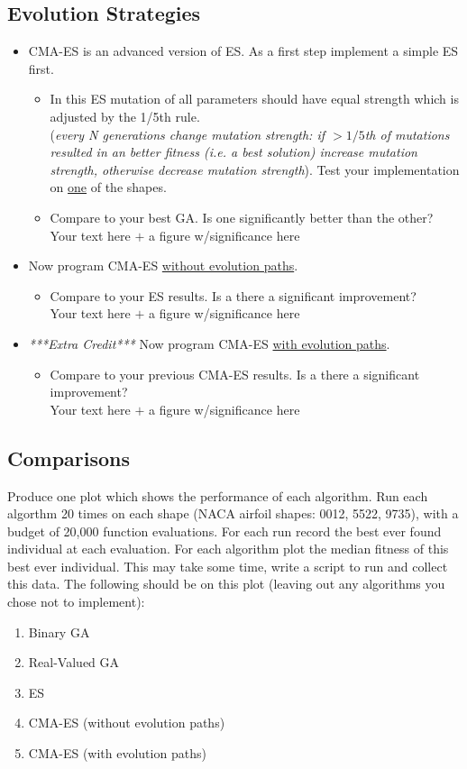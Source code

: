 \documentclass{article}
\begin{document}
\subsection{Evolution Strategies}
\begin{itemize}
	\item CMA-ES is an advanced version of ES. As a first step implement a simple ES first. 
		\begin{itemize}
			\item In this ES mutation of all parameters should have equal strength which is adjusted by the 1/5th rule.\\(\textit{every N generations change mutation strength: if $>1/5$th of mutations resulted in an better fitness (i.e. a best solution) increase mutation strength, otherwise decrease mutation strength}). Test your implementation on \underline{one} of the shapes.
			\item Compare to your best GA. Is one significantly better than the other?
			\\\color{red}Your text here $+$ a figure w/significance here\color{black}
		\end{itemize}
	\item Now program CMA-ES \underline{without evolution paths}.
	\begin{itemize}
		\item Compare to your ES results. Is a there a significant improvement?
		\\\color{red}Your text here $+$ a figure w/significance here\color{black}	
	\end{itemize}

	\item \textit{***Extra Credit***} Now program CMA-ES \underline{with evolution paths}.
		\begin{itemize}
		\item Compare to your previous CMA-ES results. Is a there a significant improvement?
		\\\color{red}Your text here $+$ a figure w/significance here\color{black}
		\end{itemize}
\end{itemize}

\newpage
\subsection{Comparisons}
Produce one plot which shows the performance of each algorithm. Run each algorthm 20 times on each shape (NACA airfoil shapes: 0012, 5522, 9735), with a budget of 20,000 function evaluations. For each run record the best ever found individual at each evaluation. For each algorithm plot the median fitness of this best ever individual. This may take some time, write a script to run and collect this data. The following should be on this plot (leaving out any algorithms you chose not to implement):
\begin{enumerate}
	\item Binary GA
	\item Real-Valued GA
	\item ES
	\item CMA-ES (without evolution paths)
	\item CMA-ES (with evolution paths)
\end{enumerate}
\end{document}
